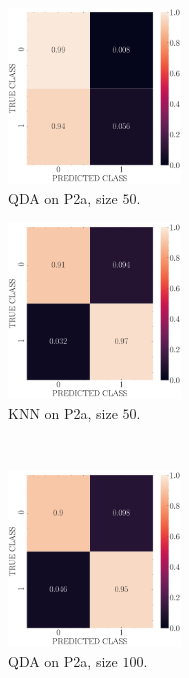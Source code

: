 \documentclass[11pt, a4 paper]{article}
\begin{document}
\begin{figure}[!htbp]
\centering
    \begin{subfigure}[!htbp]{0.24\textwidth}
       \centering
       \includegraphics[width=1.8in]{../results/ex2/conf_mtx_QD_ML_dataset_P2a_size_50.pdf}
       \caption{QDA on P2a, size $50$.}
       \label{fig:QDA_rr20_P2a_50}
    \end{subfigure}
\quad
    \begin{subfigure}[!htbp]{0.24\textwidth}
       \centering
       \includegraphics[width=1.8in]{../results/ex2/conf_mtx_KNN_dataset_P2a_size_50.pdf}
       \caption{KNN on P2a, size $50$.}
       \label{fig:KNN_rr20_P2a_50}
    \end{subfigure}
\\  
    \begin{subfigure}[!htbp]{0.24\textwidth}
       \centering
       \includegraphics[width=1.8in]{../results/ex2/conf_mtx_QD_ML_dataset_P2a_size_100.pdf}
       \caption{QDA on P2a, size $100$.}
       \label{fig:QDA_rr20_P2a_100}
    \end{subfigure}
\quad    
    \begin{subfigure}[!htbp]{0.24\textwidth}

\end{subfigure}
\end{figure}
\end{document}
